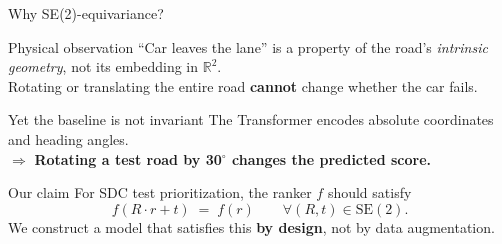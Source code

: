 \documentclass[aspectratio=169,10pt]{beamer}
\begin{document}
\begin{frame}{Why SE(2)-equivariance?}
\begin{block}{Physical observation}
\footnotesize
``Car leaves the lane'' is a property of the road's \emph{intrinsic geometry}, not its embedding in $\mathbb{R}^2$. \\[3pt]
Rotating or translating the entire road \textbf{cannot} change whether the car fails.
\end{block}

\begin{exampleblock}{Yet the baseline is not invariant}
\footnotesize
The Transformer encodes absolute coordinates and heading angles.\\
$\Rightarrow$ \textbf{Rotating a test road by 30$^\circ$ changes the predicted score.}
\end{exampleblock}

\begin{block}{Our claim}
\centering\footnotesize
For SDC test prioritization, the ranker $f$ should satisfy
\[
  f(R \cdot r + t) \;=\; f(r) \qquad \forall (R, t) \in \mathrm{SE}(2).
\]
We construct a model that satisfies this \textbf{by design}, not by data augmentation.
\end{block}
\end{frame}
\end{document}
